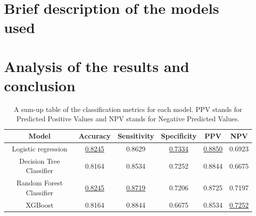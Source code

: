 \documentclass[a4paper,11pt]{article}
\begin{document}
\section{Brief description of the models used}


\section{Analysis of the results and conclusion}
\begin{table}[ht]
    \begin{tabular}[t]{|c|ccccc|}
\hline
\textbf{Model} & \textbf{Accuracy} & \textbf{Sensitivity} & \textbf{Specificity} & \textbf{PPV} & \textbf{NPV} \\
\hline
Logistic regression         & \underline{0.8245} & 0.8629 & \underline{0.7334} & \underline{0.8850} & 0.6923 \\
Decision Tree Classifier    & 0.8164          & 0.8534 & 0.7252 & 0.8844 & 0.6675 \\
Random Forest Classifier    & \underline{0.8245} & \underline{0.8719} & 0.7206 & 0.8725 & 0.7197 \\
XGBoost                     & 0.8164          & 0.8844 & 0.6675 & 0.8534 & \underline{0.7252} \\
\hline
    \end{tabular}
\centering
\caption{A sum-up table of the classification metrics for each model. PPV stands for Predicted Positive Values and NPV stands for Negative Predicted Values.}
\end{table}%
\end{document}
